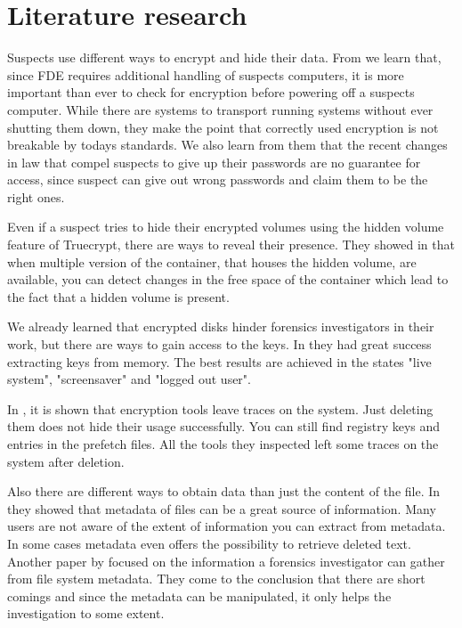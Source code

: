 \section{Literature research}

Suspects use different ways to encrypt and hide their data. From \cite{Casey2011129} we learn that, since \gls{FDE} requires additional handling of suspects computers, it is more important than ever to check for encryption before powering off a suspects computer. While there are systems to transport running systems without ever shutting them down, they make the point that correctly used encryption is not breakable by todays standards.  We also learn from them that the recent changes in law that compel suspects to give up their passwords are no guarantee for access, since suspect can give out wrong passwords and claim them to be the right ones. 

Even if a suspect tries to hide their encrypted volumes using the hidden volume feature of Truecrypt, there are ways to reveal their presence.  They showed in \cite{Hargreaves2010} that when multiple version of the container, that houses the hidden volume, are available, you can detect changes in the free space of the container which lead to the fact that a hidden volume is present.

We already learned that encrypted disks hinder forensics investigators in their work, but there are ways to gain access to the keys. In \cite{MaartmannMoe2009S132} they had great success extracting keys from memory. The best results are achieved in the states "live system", "screensaver" and "logged out user".

In \cite{5563320}, it is shown that encryption tools leave traces on the system. Just deleting them does not hide their usage successfully. You can still find registry keys and entries in the prefetch files. All the tools they inspected left some traces on the system after deletion.

Also there are different ways to obtain data than just the content of the file. In \cite{Castiglione2007750} they showed that metadata of files can be a great source of information. Many users are not aware of the extent of information you can extract from metadata. In some cases metadata even offers the possibility to retrieve deleted text. Another paper by \cite{Buchholz2004298} focused on the information a forensics investigator can gather from file system metadata. They come to the conclusion that there are short comings and since the metadata can be manipulated, it only helps the investigation to some extent.

